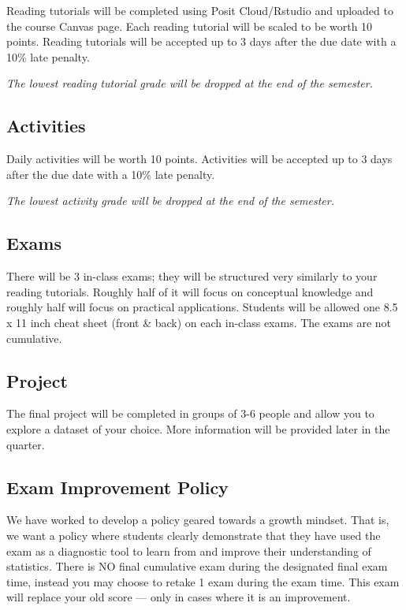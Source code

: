 \documentclass[
  letterpaper,
  DIV=11,
  numbers=noendperiod]{scrreprt}
\begin{document}
Reading tutorials will be completed using Posit Cloud/Rstudio and
uploaded to the course Canvas page. Each reading tutorial will be scaled
to be worth 10 points. Reading tutorials will be accepted up to 3 days
after the due date with a 10\% late penalty.

\emph{The lowest reading tutorial grade will be dropped at the end of
the semester.}

\hypertarget{activities}{%
\subsection*{Activities}\label{activities}}

Daily activities will be worth 10 points. Activities will be accepted up
to 3 days after the due date with a 10\% late penalty.

\emph{The lowest activity grade will be dropped at the end of the
semester.}

\hypertarget{exams}{%
\subsection*{Exams}\label{exams}}

There will be 3 in-class exams; they will be structured very similarly
to your reading tutorials. Roughly half of it will focus on conceptual
knowledge and roughly half will focus on practical applications.
Students will be allowed one 8.5 x 11 inch cheat sheet (front \& back)
on each in-class exams. The exams are not cumulative.

\hypertarget{project}{%
\subsection*{Project}\label{project}}

The final project will be completed in groups of 3-6 people and allow
you to explore a dataset of your choice. More information will be
provided later in the quarter.

\hypertarget{exam-improvement-policy}{%
\subsection*{Exam Improvement Policy}\label{exam-improvement-policy}}

We have worked to develop a policy geared towards a growth mindset. That
is, we want a policy where students clearly demonstrate that they have
used the exam as a diagnostic tool to learn from and improve their
understanding of statistics. There is NO final cumulative exam during
the designated final exam time, instead you may choose to retake 1 exam
during the exam time. This exam will replace your old score --- only in
cases where it is an improvement.
\end{document}
